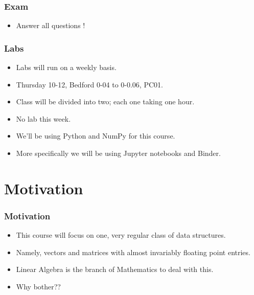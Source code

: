 \documentclass[hyperref={colorlinks=true},xcolor=svgnames]{beamer}
\begin{document}
\begin{frame}
\frametitle{Exam}

\begin{itemize}
%

\item
Answer all questions !
\end{itemize}

\end{frame}

\begin{frame}
\frametitle{Labs}

\begin{itemize}
\item Labs will run on a weekly basis.


\item Thursday 10-12, Bedford 0-04 to 0-0.06, PC01.

\item Class will be divided into two; each one taking one hour. 

\item No lab this week.

\item We'll be using Python and NumPy for this course.

\item More specifically we will be using Jupyter notebooks and Binder.

\end{itemize}

\end{frame}
\section{Motivation}
\begin{frame}
\frametitle{Motivation}

\begin{itemize}
\item This course will focus on one, very regular class of data structures.

\pause

\item Namely, vectors and matrices with almost invariably floating point entries.

\item Linear Algebra is the branch of Mathematics to deal with this.

\pause

\item Why bother??
 
\end{itemize}

\end{frame}
\end{document}
